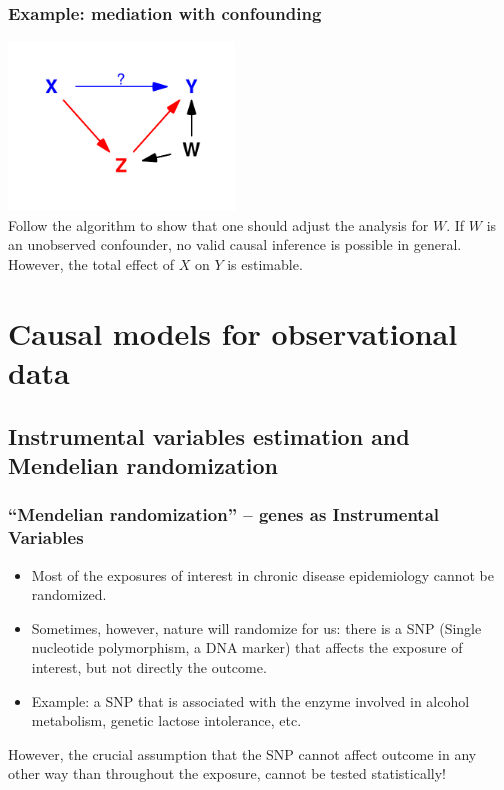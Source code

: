 \documentclass{beamer}
\begin{document}
\begin{frame}
\frametitle{Example: mediation with confounding}
\includegraphics[width=6cm]{mediation_conf}\\[-0.3cm]

Follow the algorithm to show that one should adjust the analysis for $W$. If $W$ is an unobserved confounder, no valid causal inference is possible in general. However, the total effect of $X$ on $Y$ is estimable.

\end{frame}

\section{Causal models for observational data}
\subsection{Instrumental variables estimation and Mendelian randomization}
\begin{frame}
  \frametitle{``Mendelian randomization'' -- genes as Instrumental Variables}
    \begin{itemize}
  \item \alert<1>{Most of the exposures of interest in chronic disease epidemiology cannot be randomized.}
  \item \alert<2>{Sometimes}, however, nature will randomize for us: \alert<2>{there is a SNP (Single nucleotide polymorphism, a DNA marker) that affects the exposure of interest, but not directly the outcome.} 
  \item Example: a SNP that is associated with the enzyme involved in alcohol metabolism, genetic lactose intolerance, etc. 
  \end{itemize}
However, the crucial assumption that the SNP cannot affect outcome in any other way than throughout the exposure, cannot be tested statistically!
\end{frame}
\end{document}
